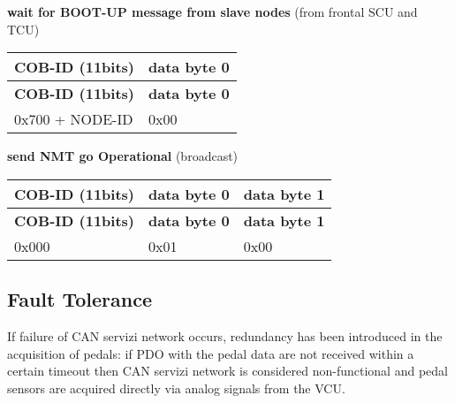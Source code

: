 \begin{DoxyEnumerate}
\item {\bfseries wait for B\+O\+O\+T-\/\+UP message from slave nodes} (from frontal S\+CU and T\+CU) \tabulinesep=1mm
\begin{longtabu} spread 0pt [c]{*{2}{|X[-1]}|}
\hline
\rowcolor{\tableheadbgcolor}\textbf{ C\+O\+B-\/\+ID (11bits)  }&\textbf{ data byte 0   }\\
\endfirsthead
\hline
\endfoot
\hline
\rowcolor{\tableheadbgcolor}\textbf{ C\+O\+B-\/\+ID (11bits)  }&\textbf{ data byte 0   }\\
\endhead
0x700 + N\+O\+D\+E-\/\+ID  &0x00   \\
\end{longtabu}

\item {\bfseries send N\+MT \textquotesingle{}go Operational\textquotesingle{}} (broadcast) \tabulinesep=1mm
\begin{longtabu} spread 0pt [c]{*{3}{|X[-1]}|}
\hline
\rowcolor{\tableheadbgcolor}\textbf{ C\+O\+B-\/\+ID (11bits)  }&\textbf{ data byte 0  }&\textbf{ data byte 1   }\\
\endfirsthead
\hline
\endfoot
\hline
\rowcolor{\tableheadbgcolor}\textbf{ C\+O\+B-\/\+ID (11bits)  }&\textbf{ data byte 0  }&\textbf{ data byte 1   }\\
\endhead
0x000  &0x01  &0x00   \\
\end{longtabu}

\end{DoxyEnumerate}

\subsection*{Fault Tolerance}

If failure of C\+AN servizi network occurs, redundancy has been introduced in the acquisition of pedals\+: if P\+DO with the pedal data are not received within a certain timeout then C\+AN servizi network is considered non-\/functional and pedal sensors are acquired directly via analog signals from the V\+CU. 
